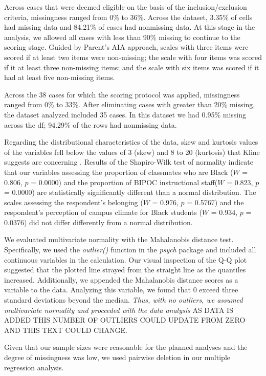 \documentclass[
  english,
]{book}
\begin{document}
Across cases that were deemed eligible on the basis of the inclusion/exclusion criteria, missingness ranged from 0\% to 36\%. Across the dataset, 3.35\% of cells had missing data and 84.21\% of cases had nonmissing data. At this stage in the analysis, we allowed all cases with less than 90\% missing to continue to the scoring stage. Guided by Parent's \citeyearpar{parent_handling_2013} AIA approach, scales with three items were scored if at least two items were non-missing; the scale with four items was scored if it at least three non-missing items; and the scale with six items was scored if it had at least five non-missing items.

Across the 38 cases for which the scoring protocol was applied, missingness ranged from 0\% to 33\%. After eliminating cases with greater than 20\% missing, the dataset analyzed included 35 cases. In this dataset we had 0.95\% missing across the df; 94.29\% of the rows had nonmissing data.

Regarding the distributional characteristics of the data, skew and kurtosis values of the variables fell below the values of 3 (skew) and 8 to 20 (kurtosis) that Kline suggests are concerning \citeyearpar{kline_principles_2016}. Results of the Shapiro-Wilk test of normality indicate that our variables assessing the proportion of classmates who are Black (\(W\) = 0.806, \(p\) = 0.0000) and the proportion of BIPOC instructional staff(\(W\) = 0.823, \(p\) = 0.0000) are statistically significantly different than a normal distribution. The scales assessing the respondent's belonging (\(W\) = 0.976, \(p\) = 0.5767) and the respondent's perception of campus climate for Black students (\(W\) = 0.934, \(p\) = 0.0376) did not differ differently from a normal distribution.

We evaluated multivariate normality with the Mahalanobis distance test. Specifically, we used the \emph{outlier()} function in the \emph{psych} package and included all continuous variables in the calculation. Our visual inspection of the Q-Q plot suggested that the plotted line strayed from the straight line as the quantiles increased. Additionally, we appended the Mahalanobis distance scores as a variable to the data. Analyzing this variable, we found that 0 exceed three standard deviations beyond the median. \emph{Thus, with no outliers, we assumed multivariate normality and proceeded with the data analysis} AS DATA IS ADDED THIS NUMBER OF OUTLIERS COULD UPDATE FROM ZERO AND THIS TEXT COULD CHANGE.

Given that our sample sizes were reasonable for the planned analyses and the degree of missingness was low, we used pairwise deletion in our multiple regression analysis.
\end{document}
